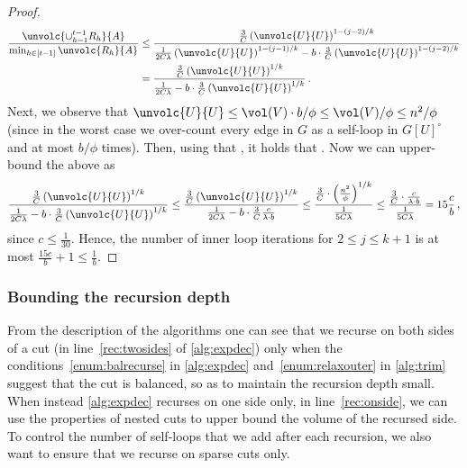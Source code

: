 \begin{proof}
	\begin{align*}
		\frac{\unvolc{\cup_{h=1}^{t-1} R_h}{A}}{\min_{h \in [t-1]} \unvolc{R_h}{A}} & \le
		\frac{\frac{3}{C}\left(\unvolc{U}{U}\right)^{1-(j-2)/k}}{\frac{1}{2C\lambda}\left(\unvolc{U}{U}\right)^{1-(j-1)/k} - b \cdot \frac{3}{C}\left(\unvolc{U}{U}\right)^{1-(j-2)/k}} \\
		& = \frac{\frac{3}{C}\left(\unvolc{U}{U}\right)^{1/k}}{\frac{1}{2C\lambda} - b \cdot \frac{3}{C}\left(\unvolc{U}{U}\right)^{1/k}} \, .
	\end{align*}
	Next, we observe that $\unvolc{U}{U} \le \vol(V)\cdot b/\phi \le \vol(V)/{\phi} \le n^2/\phi$ (since in the worst case we over-count every edge in $G$ as a self-loop in $G[U]^{\circ}$ and  at most $b/\phi$ times). Then, using that , it holds that . Now we can upper-bound the above as
	\begin{align*}
		\frac{\frac{3}{C}\left(\unvolc{U}{U}\right)^{1/k}}{\frac{1}{2C\lambda} - b \cdot \frac{3}{C}\left(\unvolc{U}{U}\right)^{1/k}}  \le \frac{\frac{3}{C}\left(\unvolc{U}{U}\right)^{1/k}}{\frac{1}{2C\lambda} - b \cdot \frac{3}{C}\frac{c}{\lambda \cdot b}} \le \frac{\frac{3}{C} \cdot \left(\frac{n^2}{\phi}\right)^{1/k}}{\frac{1}{5C \lambda} } \le \frac{\frac{3}{C} \cdot \frac{c}{\lambda \cdot b}}{\frac{1}{5C \lambda}} = 15 \frac{c}{b}\, ,
	\end{align*}
	since $c \le \frac{1}{30}$.	Hence, the number of inner loop iterations for $2 \le j \le k+1$ is at most $ \frac{15c}{b} +1\le \frac{1}{b}$.
\end{proof}

\subsubsection{Bounding the recursion depth}
\label{subsubsec:depth}
\noindent
From the description of the algorithms one can see that we recurse on both sides of a cut (in line~\eqref{rec:twosides} of \cref{alg:expdec}) only when the conditions~\eqref{enum:balrecurse} in \cref{alg:expdec} and~\eqref{enum:relaxouter} in \cref{alg:trim} suggest that the cut is balanced, so as to maintain the recursion depth small. When instead \cref{alg:expdec} recurses on one side only, in line~\eqref{rec:onside}, we can use the properties of nested cuts to upper bound the volume of the recursed side. To control the number of self-loops that we add after each recursion, we also want to ensure that we recurse on sparse cuts only.

